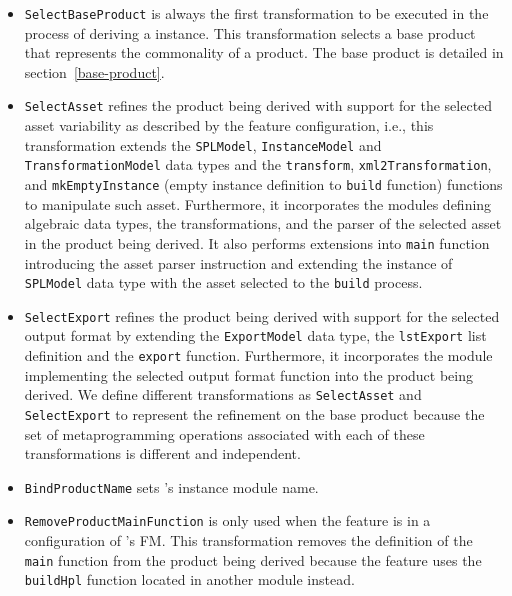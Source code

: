 \begin{itemize}

\item \texttt{SelectBaseProduct} is always the first transformation to be executed in the process of deriving a \hpl{} instance. This transformation selects a \hpl{} base product that represents the commonality of a \hpl{} product. The base product is detailed in section~\ref{base-product}.

\item \texttt{SelectAsset} refines the product being derived with support for the selected asset variability as described by the feature configuration, i.e., this transformation extends the \texttt{SPLModel}, \texttt{InstanceModel} and \texttt{TransformationModel} data types and the \texttt{transform}, \texttt{xml2Transformation}, and \texttt{mkEmptyInstance} (empty instance definition to \texttt{build} function) functions to manipulate such asset. Furthermore, it incorporates the modules defining algebraic data types, the transformations, and the parser of the selected asset in the product being derived.  It also performs extensions into \texttt{main} function introducing the asset parser instruction and extending the instance of \texttt{SPLModel} data type with the asset selected to the \texttt{build} process.

\item \texttt{SelectExport} refines the product being derived with support for the selected output format by extending the \texttt{ExportModel} data type, the \texttt{lstExport} list definition and the \texttt{export} function. Furthermore, it incorporates the module implementing the selected output format function into the product being derived. We define different transformations as \texttt{SelectAsset} and \texttt{SelectExport} to represent the refinement on the base product because the set of metaprogramming operations associated with each of these \hpl{} transformations is different and independent.

\item \texttt{BindProductName} sets \hpl{}'s instance module name.

\item \texttt{RemoveProductMainFunction} is only used when the \hp{} feature is in a configuration of \hpl's FM. This transformation removes the definition of the \texttt{main} function from the product being derived because the \hp{} feature uses the \texttt{buildHpl} function located in another module instead.


\end{itemize}
